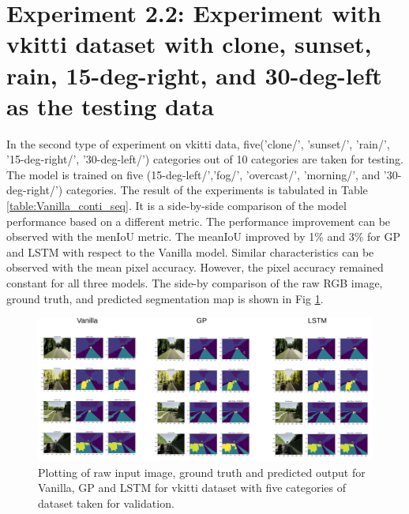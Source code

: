 	\section{Experiment 2.2: Experiment with vkitti dataset with clone, sunset, rain, 15-deg-right, and 30-deg-left as the testing data}
		
	In the second type of experiment on vkitti data, five('clone/', 'sunset/', 'rain/', '15-deg-right/',
	'30-deg-left/') categories out of 10 categories are taken for testing. The model is trained on five (15-deg-left/','fog/', 'overcast/', 'morning/', and '30-deg-right/') categories. The result of the experiments is tabulated in Table \ref{table:Vanilla_conti_seq}. It is a side-by-side comparison of the model performance based on a different metric. The performance improvement can be observed with the menIoU metric. The meanIoU improved by 1\% and 3\% for GP and LSTM with respect to the Vanilla model. Similar characteristics can be observed with the mean pixel accuracy. However, the pixel accuracy remained constant for all three models. The side-by comparison of the raw RGB image, ground truth, and predicted segmentation map is shown in Fig \ref{fig:unet_side_by_side_five_classes}. 
	
	\begin{figure}
		\centering
		\includegraphics[width=17cm]{images/unet_vkitti_five.png}
		\caption{Plotting of raw input image, ground truth and predicted output for Vanilla, GP and LSTM for vkitti dataset with five categories of dataset taken for validation.}
		\label{fig:unet_side_by_side_five_classes}
	\end{figure}

